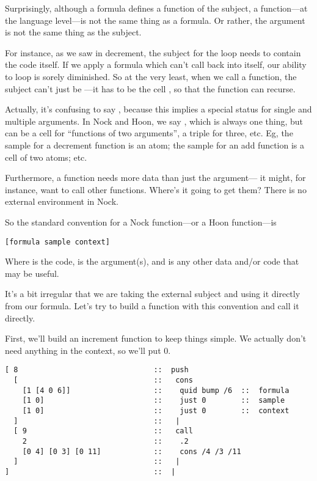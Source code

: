 Surprisingly, although a formula defines a function of the
subject, a function---at the language level---is not the same
thing as a formula.  Or rather, the argument is not the same
thing as the subject.

For instance, as we saw in decrement, the subject for the loop
needs to contain the code itself.  If we apply a formula which
can't call back into itself, our ability to loop is sorely
diminished.  So at the very least, when we call a function,
the subject can't just be ---it has to be the cell
, so that the function can recurse.

Actually, it's confusing to say , because this implies
a special status for single and multiple arguments.  In Nock and
Hoon, we say , which is always one thing, but can be a
cell for ``functions of two arguments'', a triple for three, etc.
Eg, the sample for a decrement function is an atom; the sample
for an add function is a cell of two atoms; etc.

Furthermore, a function needs more data than just the argument---
it might, for instance, want to call other functions.  Where's it
going to get them?  There is no external environment in Nock.

So the standard convention for a Nock function---or a Hoon
function---is

\begin{framed_shaded}
\begin{Verbatim}[fontsize=\relsize{-2.5},fontseries=b,commandchars=\\\{\}]
[formula sample context]
\end{Verbatim}
\end{framed_shaded}

Where  is the code,  is the argument(s), and
 is any other data and/or code that may be useful.

It's a bit irregular that we are taking the external subject
and using it directly from our formula.  Let's try to build a
function with this convention and call it directly.

First, we'll build an increment function to keep things simple.
We actually don't need anything in the context, so we'll put 0.

\begin{framed_shaded}
\begin{Verbatim}[fontsize=\relsize{-2.5},fontseries=b,commandchars=\\\{\}]
[ 8                               ::  push
  [                               ::   cons
    [1 [4 0 6]]                   ::    quid bump /6  ::  formula
    [1 0]                         ::    just 0        ::  sample
    [1 0]                         ::    just 0        ::  context
  ]                               ::   |
  [ 9                             ::   call
    2                             ::    .2
    [0 4] [0 3] [0 11]            ::    cons /4 /3 /11
  ]                               ::   |
]                                 ::  |
\end{Verbatim}
\end{framed_shaded}

